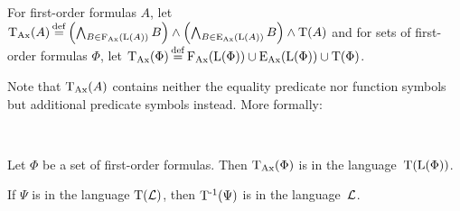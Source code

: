 \begin{defi}
	For first-order formulas $A$, let $\TransAll(A) \defeq
	\left(\bigwedge_{B\in\FAX(\Lang(A))} B \right) \land
	\left(\bigwedge_{B\in\EAX(\Lang(A))} B \right) \land
	\Trans(A)$ and for sets of first-order formulas $\Phi$, let $\TransAll(\Phi) \defeq \FAX(\Lang(\Phi)) \cup  \EAX(\Lang(\Phi)) \cup \Trans(\Phi)$.
\end{defi}


Note that $\operatorname{\operatorname{T}_{Ax}}(A)$ contains neither the equality predicate nor function symbols but additional predicate symbols instead. More formally:




\begin{samepage}
	\begin{lemma}~
		\label{lemma:transLang}
		\begin{compactenum}
		\item
			Let $\Phi$ be a set of first-order formulas. Then $\operatorname{\operatorname{T}_{Ax}}(\Phi)$ is in the language~$\operatorname{T}(\operatorname{L}(\Phi))$.
			\label{lemma:transLang1}

		\item 
			If $\Psi$ is in the language $\operatorname{T}(\operatorname{\mathcal{L}})$, then $\operatorname{T^{-1}}(\Psi)$ is in the language~$\operatorname{\mathcal{L}}$.
			\label{lemma:transLang2}
		\end{compactenum}
	\end{lemma}
\end{samepage}

